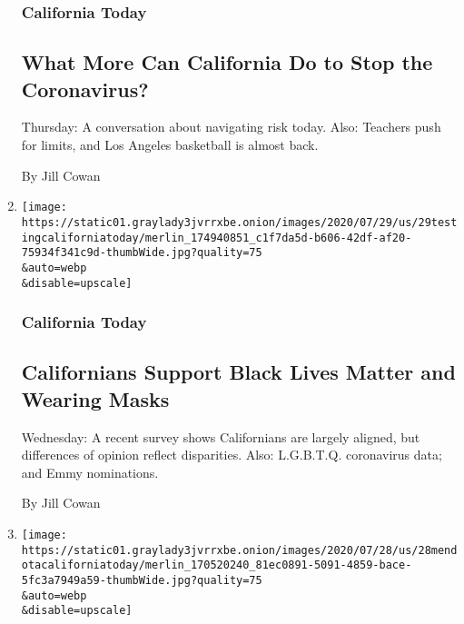 \begin{enumerate}
  \hypertarget{california-today-1}{%
  \subsubsection{California Today}\label{california-today-1}}

  \hypertarget{what-more-can-california-do-to-stop-the-coronavirus}{%
  \subsection{What More Can California Do to Stop the
  Coronavirus?}\label{what-more-can-california-do-to-stop-the-coronavirus}}

  Thursday: A conversation about navigating risk today. Also: Teachers
  push for limits, and Los Angeles basketball is almost back.

  By Jill Cowan
\item
  \href{/2020/07/29/us/california-coronavirus-demographics.html}{}

  \texttt{[image: https://static01.graylady3jvrrxbe.onion/images/2020/07/29/us/29testingcaliforniatoday/merlin\_174940851\_c1f7da5d-b606-42df-af20-75934f341c9d-thumbWide.jpg?quality=75\\\&auto=webp\\\&disable=upscale]}

  \hypertarget{california-today-2}{%
  \subsubsection{California Today}\label{california-today-2}}

  \hypertarget{californians-support-black-lives-matter-and-wearing-masks}{%
  \subsection{Californians Support Black Lives Matter and Wearing
  Masks}\label{californians-support-black-lives-matter-and-wearing-masks}}

  Wednesday: A recent survey shows Californians are largely aligned, but
  differences of opinion reflect disparities. Also: L.G.B.T.Q.
  coronavirus data; and Emmy nominations.

  By Jill Cowan
\item
  \href{/2020/07/28/us/newsom-coronavirus-valley.html}{}

  \texttt{[image: https://static01.graylady3jvrrxbe.onion/images/2020/07/28/us/28mendotacaliforniatoday/merlin\_170520240\_81ec0891-5091-4859-bace-5fc3a7949a59-thumbWide.jpg?quality=75\\\&auto=webp\\\&disable=upscale]}


\end{enumerate}
